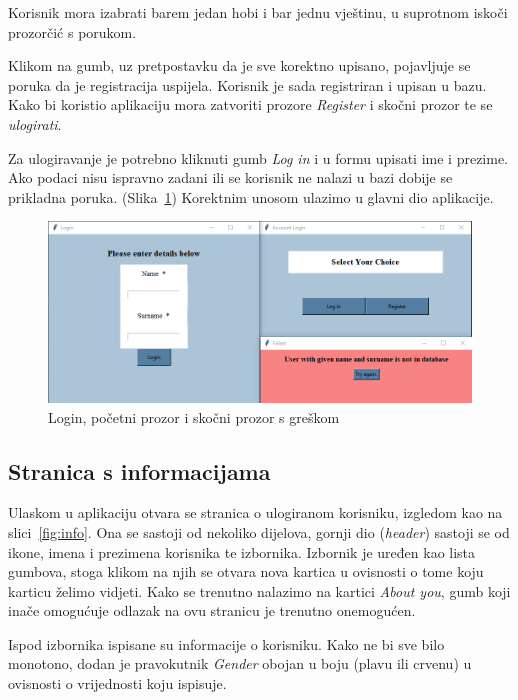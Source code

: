\documentclass[titlepage, 12pt]{scrartcl}
\begin{document}
	Korisnik mora izabrati barem jedan hobi i bar jednu vještinu, u suprotnom iskoči prozorčić s porukom. 
	
	Klikom na gumb, uz pretpostavku da je sve korektno upisano, pojavljuje se poruka da je registracija uspijela. Korisnik je sada registriran i upisan u bazu. Kako bi koristio aplikaciju mora zatvoriti prozore \emph{Register} i skočni prozor te se \emph{ulogirati}.
	
	Za ulogiravanje je potrebno kliknuti gumb \emph{Log in} i u formu upisati ime i prezime. Ako podaci nisu ispravno zadani ili se korisnik ne nalazi u bazi dobije se prikladna poruka. (Slika~\ref{fig:login}) Korektnim unosom ulazimo u glavni dio aplikacije. 
	
	\begin{figure}
		\begin{center}
			\includegraphics[scale=0.5]{slike/login.png}
			\caption{Login, početni prozor i skočni prozor s greškom}
			\label{fig:login} 
		\end{center}
	\end{figure}
	
	\subsection{Stranica s informacijama}
	
	Ulaskom u aplikaciju otvara se stranica o ulogiranom korisniku, izgledom kao na slici~\ref{fig:info}. Ona se sastoji od nekoliko dijelova, gornji dio (\emph{header}) sastoji se od ikone, imena i prezimena korisnika te izbornika. Izbornik je uređen kao lista gumbova, stoga klikom na njih se otvara nova kartica u ovisnosti o tome koju karticu želimo vidjeti. Kako se trenutno nalazimo na kartici \emph{About you}, gumb koji inače omogućuje odlazak na ovu stranicu je trenutno onemogućen. 
	
	Ispod izbornika ispisane su informacije o korisniku. Kako ne bi sve bilo monotono, dodan je pravokutnik \emph{Gender} obojan u boju (plavu ili crvenu) u ovisnosti o vrijednosti koju ispisuje. 
	
\end{document}
